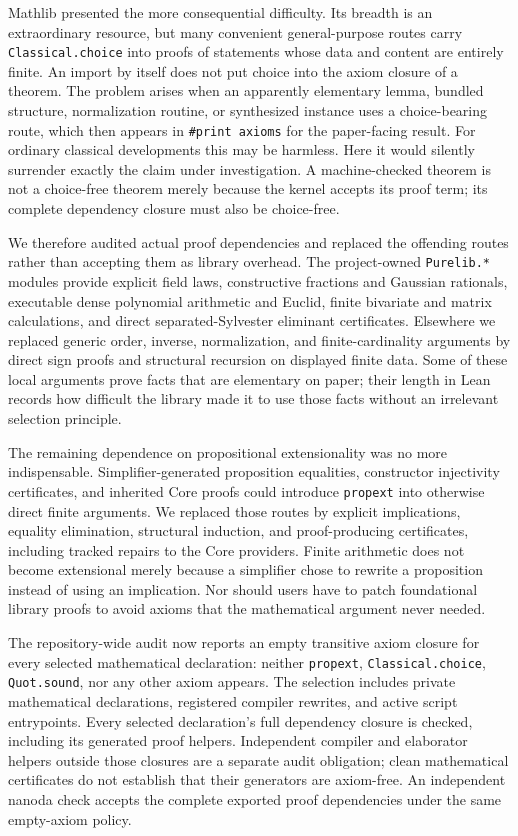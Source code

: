 \documentclass[11pt]{article}
\begin{document}
Mathlib presented the more consequential difficulty.  Its breadth is an
extraordinary resource, but many convenient general-purpose routes carry
\texttt{Classical.choice} into proofs of statements whose data and content
are entirely finite.  An import by itself does not put choice into the axiom
closure of a theorem.  The problem arises when an apparently elementary
lemma, bundled structure, normalization routine, or synthesized instance
uses a choice-bearing route, which then appears in \texttt{\#print axioms}
for the paper-facing result.  For ordinary classical developments this may
be harmless.  Here it would silently surrender exactly the claim under
investigation.  A machine-checked theorem is not a choice-free theorem merely
because the kernel accepts its proof term; its complete dependency closure
must also be choice-free.

We therefore audited actual proof dependencies and replaced the offending
routes rather than accepting them as library overhead.  The project-owned
\texttt{Purelib.*} modules provide explicit field laws,
constructive fractions and Gaussian rationals, executable dense polynomial
arithmetic and Euclid, finite bivariate and matrix calculations, and direct
separated-Sylvester eliminant certificates.  Elsewhere we replaced generic order,
inverse, normalization, and finite-cardinality arguments by direct sign
proofs and structural recursion on displayed finite data.  Some of these
local arguments prove facts that are elementary on paper; their length in
Lean records how difficult the library made it to use those facts without an
irrelevant selection principle.

The remaining dependence on propositional extensionality was no more
indispensable.  Simplifier-generated proposition equalities, constructor
injectivity certificates, and inherited Core proofs could introduce
\texttt{propext} into otherwise direct finite arguments.  We replaced those
routes by explicit implications, equality elimination, structural induction,
and proof-producing certificates, including tracked repairs to the Core
providers.  Finite arithmetic does not become extensional merely because a
simplifier chose to rewrite a proposition instead of using an implication.
Nor should users have to patch foundational library proofs to avoid axioms
that the mathematical argument never needed.

The repository-wide audit now reports an empty transitive axiom closure for
every selected mathematical declaration: neither \texttt{propext},
\texttt{Classical.choice}, \texttt{Quot.sound}, nor any other axiom appears.
The selection includes private mathematical declarations, registered compiler
rewrites, and active script entrypoints.  Every selected declaration's full
dependency closure is checked, including its generated proof helpers.
Independent compiler and elaborator helpers outside those closures are a
separate audit obligation; clean mathematical certificates do not establish
that their generators are axiom-free.  An independent nanoda check accepts the
complete exported proof dependencies under the same empty-axiom policy.
\end{document}
